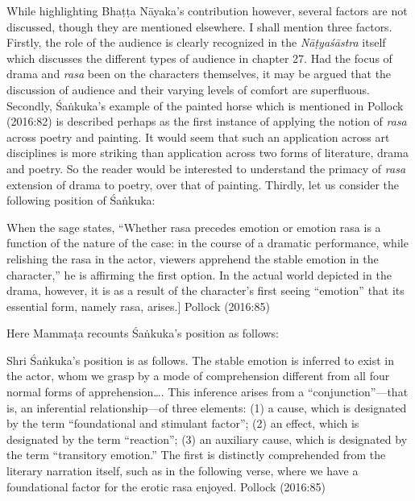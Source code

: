 While highlighting Bhaṭṭa Nāyaka’s contribution however, several factors are not discussed, though they are mentioned elsewhere. I shall mention three factors. Firstly, the role of the audience is clearly recognized in the \textsl{Nāṭyaśāstra} itself which discusses the different types of audience in chapter 27. Had the focus of drama and \textsl{rasa} been on the characters themselves, it may be argued that the discussion of audience and their varying levels of comfort are superfluous. Secondly, Śaṅkuka’s example of the painted horse which is mentioned in Pollock (2016:82) is described perhaps as the first instance of applying the notion of \textsl{rasa} across poetry and painting. It would seem that such an application across art disciplines is more striking than application across two forms of literature, drama and poetry. So the reader would be interested to understand the primacy of \textsl{rasa} extension of drama to poetry, over that of painting. Thirdly, let us consider the following position of Śaṅkuka:

\begin{myquote}
When the sage states, “Whether rasa precedes emotion or emotion rasa is a function of the nature of the case: in the course of a dramatic performance, while relishing the rasa in the actor, viewers apprehend the stable emotion in the character,” he is affirming the first option. In the actual world depicted in the drama, however, it is as a result of the character’s first seeing “emotion” that its essential form, namely rasa, arises.]
\hfill Pollock (2016:85)
\end{myquote}

Here Mammaṭa recounts Śaṅkuka’s position as follows:

\begin{myquote}
Shri Śaṅkuka’s position is as follows. The stable emotion is inferred to exist in the actor, whom we grasp by a mode of comprehension different from all four normal forms of apprehension…. This inference arises from a “conjunction”—that is, an inferential relationship—of three elements: (1) a cause, which is designated by the term “foundational and stimulant factor”; (2) an effect, which is designated by the term “reaction”; (3) an auxiliary cause, which is designated by the term “transitory emotion.” The first is distinctly comprehended from the literary narration itself, such as in the following verse, where we have a foundational factor for the erotic rasa enjoyed.
\hfill Pollock (2016:85)
\end{myquote}

